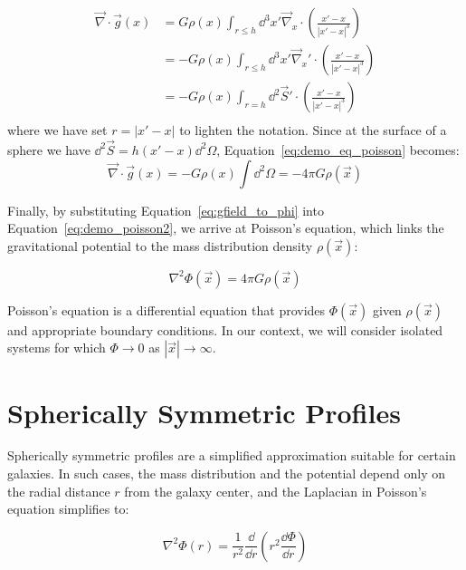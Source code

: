 \begin{equation}
    \begin{split}
    \label{eq:demo_eq_poisson}
    \Vec{\nabla}\cdot \Vec{g}(x) &= G\rho (x) \int_{r \leq h} \dd^3 x' \Vec{\nabla}_x \cdot \left(\frac{x'-x}{|x'-x|^3}\right)\\
                                 &= - G\rho (x) \int_{r \leq h} \dd^3 x' \Vec{\nabla}_x' \cdot \left(\frac{x'-x}{|x'-x|^3}\right)\\
                                 &= - G\rho (x) \int_{r = h} \dd^2 \Vec{S}'\cdot \left(\frac{x'-x}{|x'-x|^3}\right)\\
    \end{split}
\end{equation}
where we have set $r=|x'-x|$ to lighten the notation. Since at the surface of a sphere we have $\dd^2 \Vec{S} = h (x'-x)  \dd^2 \Omega$, Equation~\eqref{eq:demo_eq_poisson} becomes:
\begin{equation}
    \label{eq:demo_poisson2}
    \Vec{\nabla}\cdot \Vec{g}(x) = - G\rho (x) \int \dd^2 \Omega = -4\pi G\rho(\Vec{x})
\end{equation}

Finally, by substituting Equation~\eqref{eq:gfield_to_phi} into Equation~\eqref{eq:demo_poisson2}, we arrive at Poisson's equation, which links the gravitational potential to the mass distribution density $\rho(\Vec{x})$:

\begin{equation}
\label{eq:poisson_eq_general}
\nabla^2 \Phi(\Vec{x}) = 4 \pi G \rho(\Vec{x})
\end{equation}

\par Poisson's equation is a differential equation that provides $\Phi(\Vec{x})$ given $\rho(\Vec{x})$ and appropriate boundary conditions. In our context, we will consider isolated systems for which $\Phi \rightarrow 0$ as $|\Vec{x}| \rightarrow \infty$.

\section{Spherically Symmetric Profiles}\label{sec:spherical-symmetry}
Spherically symmetric profiles are a simplified approximation suitable for certain galaxies. In such cases, the mass distribution and the potential depend only on the radial distance $r$ from the galaxy center, and the Laplacian in Poisson's equation simplifies to:

\begin{equation}
\label{eq:poisson_spherique}
\nabla^2 \Phi(r) = \frac{1}{r^2}\frac{\dd}{\dd r}\left(r^2\frac{\dd \Phi}{\dd r}\right)
\end{equation}

